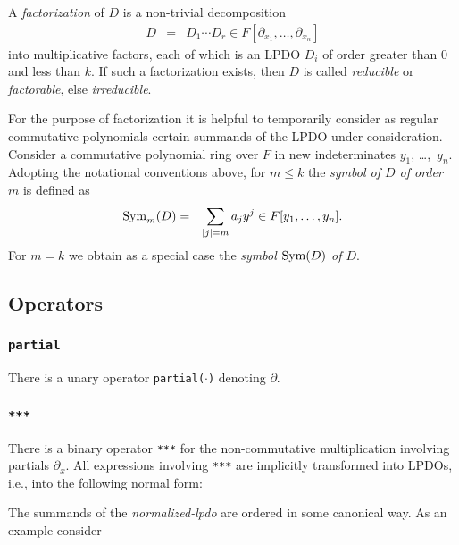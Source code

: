 A \emph{factorization} of $D$ is a non-trivial decomposition
\begin{eqnarray*}
D &=& D_1 \cdots D_r\in F[\partial_{x_1},\dots,\partial_{x_n}]
\end{eqnarray*}
into multiplicative factors, each of which is an LPDO $D_i$ of order
greater than $0$ and less than $k$. If such a factorization exists,
then $D$ is called \emph{reducible} or \emph{factorable}, else
\emph{irreducible}.

For the purpose of factorization it is helpful to temporarily consider
as regular commutative polynomials certain summands of the LPDO under
consideration. Consider a commutative polynomial ring over $F$ in new
indeterminates $y_1$, \dots,~$y_n$. Adopting the notational
conventions above, for $m\leq k$ the \emph{symbol of $D$ of order $m$}
is defined as
\begin{eqnarray*}
  \operatorname{Sym}_m(D) &=& \sum_{|j| = m} a_j y^j\in F[y_1,\dots,y_n].
\end{eqnarray*}
For $m=k$ we obtain as a special case the \emph{symbol $\operatorname{Sym}(D)$ of
  $D$}.

\subsection{Operators}

\subsubsection{\texttt{partial}}
There is a unary operator \texttt{partial($\cdot$)} denoting
$\partial$.

\begin{center}
  \begin{ebnf}
  \end{ebnf}
\end{center}

\subsubsection{\texttt{***}}
There is a binary operator \texttt{***} for the non-commutative
multiplication involving partials $\partial_x$. All expressions
involving \texttt{***} are implicitly transformed into LPDOs, i.e.,
into the following normal form:
\begin{center}
  \begin{ebnf}
  \end{ebnf}
\end{center}
The summands of the \textit{normalized-lpdo} are ordered in some
canonical way. As an example consider

